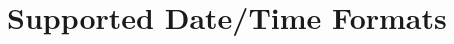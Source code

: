 \documentclass[draft,final]{vutinfth} %
\begin{document}
\chapter{Supported Date/Time Formats}
\label{ch:appendix-c}




\backmatter

\listoffigures %

\cleardoublepage %
\listoftables %

\listofalgorithms
{}

\printindex

\printglossaries



\end{document}
